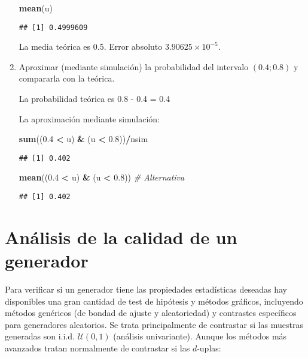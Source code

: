 \documentclass[
]{book}
\newenvironment{Shaded}{\begin{snugshade}}{\end{snugshade}}
\newcommand{\CommentTok}[1]{\textcolor[rgb]{0.56,0.35,0.01}{\textit{#1}}}
\newcommand{\FloatTok}[1]{\textcolor[rgb]{0.00,0.00,0.81}{#1}}
\newcommand{\KeywordTok}[1]{\textcolor[rgb]{0.13,0.29,0.53}{\textbf{#1}}}
\newcommand{\NormalTok}[1]{#1}
\newcommand{\OperatorTok}[1]{\textcolor[rgb]{0.81,0.36,0.00}{\textbf{#1}}}
\newcommand{\StringTok}[1]{\textcolor[rgb]{0.31,0.60,0.02}{#1}}
\theoremstyle{break}
\theoremstyle{definition}
\theoremstyle{definition}
\theoremstyle{definition}
\theoremstyle{remark}
\begin{document}
\begin{enumerate}
\begin{Shaded}
\begin{Highlighting}[]
\KeywordTok{mean}\NormalTok{(u)}
\end{Highlighting}
\end{Shaded}

\begin{verbatim}
## [1] 0.4999609
\end{verbatim}

  La media teórica es 0.5.
  Error absoluto \(\ensuremath{3.90625\times 10^{-5}}\).
\item
  Aproximar (mediante simulación) la probabilidad del intervalo
  \((0.4;0.8)\) y compararla con la teórica.

  La probabilidad teórica es 0.8 - 0.4 = 0.4

  La aproximación mediante simulación:

\begin{Shaded}
\begin{Highlighting}[]
\KeywordTok{sum}\NormalTok{((}\FloatTok{0.4} \OperatorTok{<}\StringTok{ }\NormalTok{u) }\OperatorTok{&}\StringTok{ }\NormalTok{(u }\OperatorTok{<}\StringTok{ }\FloatTok{0.8}\NormalTok{))}\OperatorTok{/}\NormalTok{nsim}
\end{Highlighting}
\end{Shaded}

\begin{verbatim}
## [1] 0.402
\end{verbatim}

\begin{Shaded}
\begin{Highlighting}[]
\KeywordTok{mean}\NormalTok{((}\FloatTok{0.4} \OperatorTok{<}\StringTok{ }\NormalTok{u) }\OperatorTok{&}\StringTok{ }\NormalTok{(u }\OperatorTok{<}\StringTok{ }\FloatTok{0.8}\NormalTok{))     }\CommentTok{# Alternativa}
\end{Highlighting}
\end{Shaded}

\begin{verbatim}
## [1] 0.402
\end{verbatim}
\end{enumerate}

\hypertarget{calgen}{%
\section{Análisis de la calidad de un generador}\label{calgen}}

Para verificar si un generador tiene las propiedades estadísticas deseadas hay disponibles una gran cantidad de test de hipótesis y métodos gráficos,
incluyendo métodos genéricos (de bondad de ajuste y aleatoriedad) y contrastes específicos para generadores aleatorios.
Se trata principalmente de contrastar si las muestras generadas son i.i.d. \(\mathcal{U}\left(0,1\right)\) (análisis univariante).
Aunque los métodos más avanzados tratan normalmente de contrastar si las \(d\)-uplas:
\end{document}
